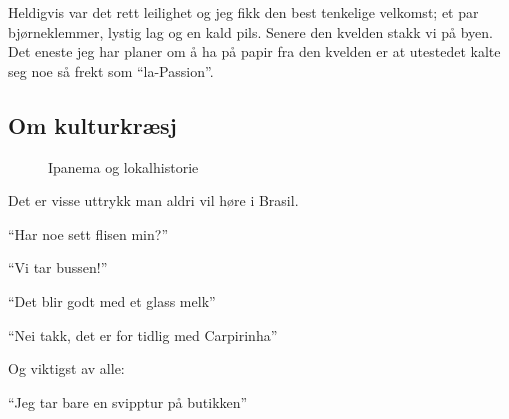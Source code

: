 Heldigvis var det rett leilighet og jeg fikk den best tenkelige
velkomst; et par
bjørneklemmer, lystig lag og en kald pils. Senere den kvelden stakk
vi på byen. Det eneste jeg har planer om å ha på papir fra den
kvelden er at utestedet kalte seg noe så frekt som ``la-Passion''.
\clearpage

\subsection*{Om kulturkræsj}
\begin{figure}[h]
	\centering
	\noindent{}
	\caption*{Ipanema og lokalhistorie}
\label{fig:mengelezoo}

\end{figure}

Det er visse uttrykk man aldri vil høre i Brasil.\\
\begin{dialogue}
	\item ``Har noe sett flisen min?''\\
	\item ``Vi tar bussen!''\\
	\item ``Det blir godt med et glass melk''\\
	\item ``Nei takk, det er for tidlig med Carpirinha''\\	
\end{dialogue}
Og viktigst av alle:\\
\begin{dialogue}
	\item ``Jeg tar bare en svipptur på butikken''
\end{dialogue}\\

